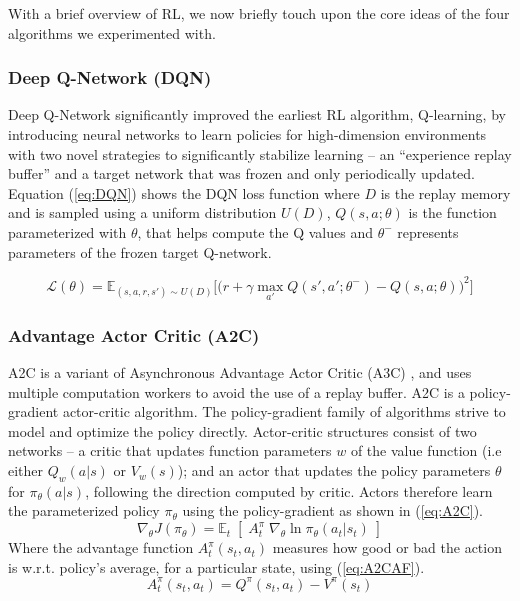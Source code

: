 \documentclass[a4paper, 12pt]{article}
\begin{document}
With a brief overview of RL, we now briefly touch upon the core ideas of the four algorithms we experimented with.

\subsubsection*{Deep Q-Network (DQN)}
Deep Q-Network \citep{DQN-mnih2013} significantly improved the earliest RL algorithm, Q-learning, by introducing neural networks to learn policies for high-dimension environments with two novel strategies to significantly stabilize learning -- an ``experience replay buffer'' and a target network that was frozen and only periodically updated. Equation (\ref{eq:DQN}) shows the DQN loss function where $D$ is the replay memory and is sampled using a uniform distribution $U(D)$, $Q(s, a; \theta)$ is the function parameterized with $\theta$, that helps compute the Q values and $\theta^{-}$ represents parameters of the frozen target Q-network.

\begin{equation}
	\mathcal{L}(\theta) = \mathbb{E}_{(s, a, r, s') \sim U(D)} \Big[ \big( r + \gamma \max_{a'} Q(s', a'; \theta^{-}) - Q(s, a; \theta) \big)^2 \Big]
	\label{eq:DQN}
\end{equation}

\subsubsection*{Advantage Actor Critic (A2C)}

A2C is a variant of Asynchronous Advantage Actor Critic (A3C) \citep{A2C-mnih2016}, and uses multiple computation workers to avoid the use of a replay buffer. A2C is a policy-gradient actor-critic algorithm. The policy-gradient family of algorithms strive to model and optimize the policy directly. Actor-critic structures consist of two networks -- a critic that updates function parameters $w$ of the value function (i.e either $Q_w(a \vert s)$ or $V_w(s)$); and an actor that updates the policy parameters $\theta$ for $\pi_\theta(a \vert s)$, following the direction computed by critic. Actors therefore learn the parameterized policy $\pi_{\theta}$ using the policy-gradient as shown in (\ref{eq:A2C}). 
\begin{equation}
	\nabla_ \theta J(\pi_\theta) = \mathbb{E}_t \; [ \; A^\pi_t \; \nabla_\theta \ln \pi_\theta(a_t \vert s_t) \;]
	\label{eq:A2C}
\end{equation}
Where the advantage function $A^\pi_t (s_t, a_t)$ measures how good or bad the action is w.r.t. policy's average, for a particular state, using (\ref{eq:A2CAF}).
\begin{equation}
	A^\pi_t (s_t, a_t) = Q^\pi (s_t, a_t) - V^\pi (s_t)
	\label{eq:A2CAF}
\end{equation}
\end{document}

